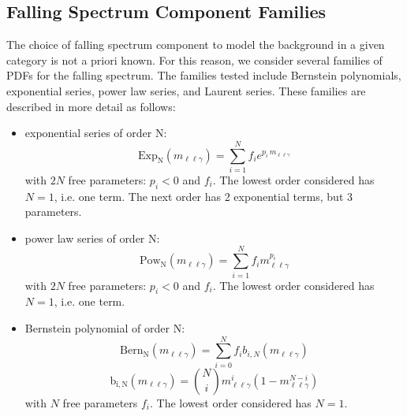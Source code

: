 \subsection{Falling Spectrum Component Families}
The choice of falling spectrum component to model the background in a given category is not a priori known. For this reason, we consider several 
families of PDFs for the falling spectrum. The families tested include Bernstein polynomials, exponential series, power law series, and 
Laurent series. These families are described in more detail as follows:

\begin{itemize}
	\item exponential series of order N:
	\begin{equation}
        \mathrm{Exp_{N}}(m_{\ell\ell\gamma}) = \sum\limits_{i=1}^{N}f_ie^{p_i\, m_{\ell\ell\gamma}}
	\end{equation}
	with $2N$ free parameters: $p_i < 0$ and $f_i$.
	The lowest order considered has $N=1$, i.e. one term.
	The next order has 2 exponential terms, but 3 parameters.	

	\item power law series of order N:
	\begin{equation}
        \mathrm{Pow_{N}}(m_{\ell\ell\gamma}) = \sum\limits_{i=1}^{N}f_im_{\ell\ell\gamma}^{p_i}
	\end{equation}
	with $2N$ free parameters: $p_i < 0$ and $f_i$.
	The lowest order considered has $N=1$, i.e. one term.
	
	\item Bernstein polynomial of order N:
    \begin{equation}
        \mathrm{Bern_{N}}(m_{\ell\ell\gamma}) = \sum\limits_{i=0}^{N}f_{i}b_{i,N}(m_{\ell\ell\gamma})
    \end{equation}
    \begin{equation}
        \mathrm{b_{i,N}}(m_{\ell\ell\gamma}) = \binom{N}{i}m_{\ell\ell\gamma}^{i}(1 - m_{\ell\ell\gamma}^{N-i})
    \end{equation}
    with $N$ free parameters $f_{i}$. The lowest order considered has $N=1$.


\end{itemize}
